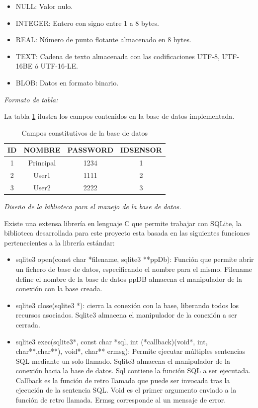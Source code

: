 \begin{itemize}
\item NULL: Valor nulo.
\item INTEGER: Entero con signo entre 1 a 8 bytes.
\item REAL: Número de punto flotante almacenado en 8 bytes.
\item TEXT: Cadena de texto almacenada con las codificaciones UTF-8, UTF-16BE ó UTF-16-LE.
\item BLOB: Datos en formato binario.
\end{itemize}

\textsl{Formato de tabla:}

La tabla \ref{tab:tabla} ilustra los campos contenidos en la base de datos implementada.

\begin{table}[h]
	\centering
	\caption[Tabla implementada]{Campos constitutivos de la base de datos}
	\begin{tabular}{c c c c}    
		\toprule
		\textbf{ID}  & \textbf{NOMBRE}  & \textbf{PASSWORD} & \textbf{IDSENSOR}\\
		\midrule
		1		& Principal		& 1234	& 1\\		
		2		& User1			& 1111	& 2\\
		3		& User2			& 2222	& 3\\					
		\bottomrule
		\hline
	\end{tabular}
	\label{tab:tabla}
\end{table}

\textsl{Diseño de la biblioteca para el manejo de la base de datos.}

Existe una extensa librería en lenguaje C que permite trabajar con SQLite, la biblioteca desarrollada para este proyecto esta basada en las siguientes funciones pertenecientes a la librería estándar:

\begin{itemize}
\item sqlite3 open(const char *filename, sqlite3 **ppDb): Función que permite abrir un fichero de base de datos, especificando el nombre para el mismo.
Filename define el nombre de la base de datos
ppDB almacena el manipulador de la conexión con la base creada.
\item sqlite3 close(sqlite3 *): cierra la conexión con la base, liberando todos los recursos asociados.
Sqlite3 almacena el manipulador de la conexión a ser cerrada.
\item sqlite3 exec(sqlite3*, const char *sql, int (*callback)(void*, int, char**,char**), void*, char** ermsg): Permite ejecutar múltiples sentencias SQL mediante un solo llamado.
Sqlite3 almacena el manipulador de la conexión hacia la base de datos.
Sql contiene la función SQL a ser ejecutada.
Callback es la función de retro llamada que puede ser invocada tras la ejecución de la sentencia SQL.
Void es el primer argumento enviado a la función de retro llamada.
Ermsg corresponde al un mensaje de error.
\end{itemize}

